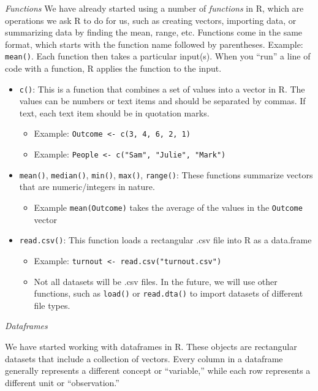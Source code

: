\documentclass[
  letterpaper,
  DIV=11,
  numbers=noendperiod]{scrreprt}
\providecommand{\tightlist}{%
  \setlength{\itemsep}{0pt}\setlength{\parskip}{0pt}}\usepackage{longtable,booktabs,array}
\begin{document}
\emph{Functions} We have already started using a number of
\emph{functions} in R, which are operations we ask R to do for us, such
as creating vectors, importing data, or summarizing data by finding the
mean, range, etc. Functions come in the same format, which starts with
the function name followed by parentheses. Example: \texttt{mean()}.
Each function then takes a particular input(s). When you ``run'' a line
of code with a function, R applies the function to the input.

\begin{itemize}
\tightlist
\item
  \texttt{c()}: This is a function that combines a set of values into a
  vector in R. The values can be numbers or text items and should be
  separated by commas. If text, each text item should be in quotation
  marks.

  \begin{itemize}
  \tightlist
  \item
    Example: \texttt{Outcome\ \textless{}-\ c(3,\ 4,\ 6,\ 2,\ 1)}
  \item
    Example: \texttt{People\ \textless{}-\ c("Sam",\ "Julie",\ "Mark")}
  \end{itemize}
\item
  \texttt{mean()}, \texttt{median()}, \texttt{min()}, \texttt{max()},
  \texttt{range()}: These functions summarize vectors that are
  numeric/integers in nature.

  \begin{itemize}
  \tightlist
  \item
    Example \texttt{mean(Outcome)} takes the average of the values in
    the \texttt{Outcome} vector
  \end{itemize}
\item
  \texttt{read.csv()}: This function loads a rectangular .csv file into
  R as a data.frame

  \begin{itemize}
  \tightlist
  \item
    Example: \texttt{turnout\ \textless{}-\ read.csv("turnout.csv")}
  \item
    Not all datasets will be .csv files. In the future, we will use
    other functions, such as \texttt{load()} or \texttt{read.dta()} to
    import datasets of different file types.
  \end{itemize}
\end{itemize}

\emph{Dataframes}

We have started working with dataframes in R. These objects are
rectangular datasets that include a collection of vectors. Every column
in a dataframe generally represents a different concept or ``variable,''
while each row represents a different unit or ``observation.''
\end{document}
